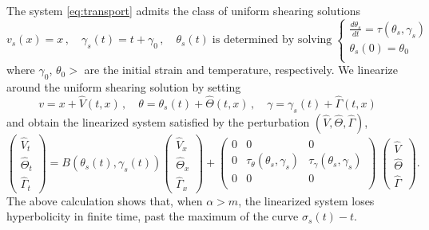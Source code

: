 \documentclass[usletter,11pt]{article}
\theoremstyle{remark}
\begin{document}
The system  \eqref{eq:transport} admits the class of uniform shearing solutions
\begin{equation} \label{app-uss}
v_s (x) = x \, , \quad \gamma_s (t) = t + \gamma_0 \, , \quad \theta_s (t)  \; \mbox{is determined by solving}  \; 
\begin{cases} \frac{d\theta_s}{dt} = \tau (\theta_s, \gamma_s) & \\
\theta_s (0) = \theta_0 & \\
\end{cases}
\end{equation}
where $\gamma_0$, $\theta_0 >$ are the initial strain and temperature, respectively. We linearize around the uniform shearing solution by setting
$$
v = x + \hat V(t,x) \, , \quad \theta = \theta_s (t) + \hat\Theta (t,x) \, , \quad \gamma = \gamma_s (t) + \hat\Gamma (t,x)
$$
and obtain the linearized system satisfied by the perturbation $(\hat V, \hat\Theta, \hat\Gamma )$,
\begin{equation}  %
 \begin{pmatrix} \hat V_t \\ \hat\Theta_t \\ \hat\Gamma_t \end{pmatrix} =  B (\theta_s(t) , \gamma_s (t) )  \begin{pmatrix} \hat V_x  \\ \hat\Theta_x \\  \hat\Gamma_x  \end{pmatrix}
 +
 \begin{pmatrix}
  0 & 0 & 0 \\
 0 & \tau_\theta (\theta_s , \gamma_s ) & \tau_\gamma (\theta_s , \gamma_s ) \\
 0 & 0 & 0 \\
 \end{pmatrix} \; 
  \begin{pmatrix} \hat V  \\ \hat\Theta \\  \hat\Gamma  \end{pmatrix}.
\end{equation}
The above calculation shows that, when $\alpha > m$,  the linearized system 
loses hyperbolicity in finite time, past the maximum of the curve $\sigma_s (t) - t$.
\end{document}
